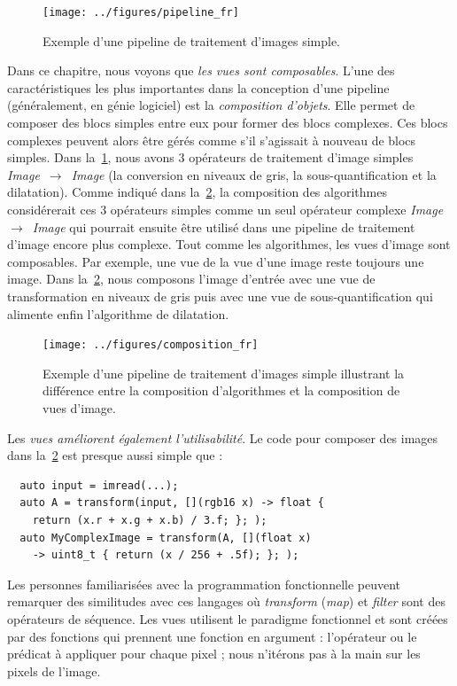 \begin{figure}[htbp]
  \centering
  \texttt{[image: ../figures/pipeline\_fr]}
  \caption[]{Exemple d'une pipeline de traitement d'images simple.}
  \label{resume:fig:view.pipeline}
\end{figure}

Dans ce chapitre, nous voyons que \emph{les vues sont composables}. L'une des caractéristiques les plus importantes dans
la conception d'une pipeline (généralement, en génie logiciel) est la \emph{composition d'objets}. Elle permet de
composer des blocs simples entre eux pour former des blocs complexes. Ces blocs complexes peuvent alors être gérés comme
s'il s'agissait à nouveau de blocs simples. Dans la~\cref{resume:fig:view.pipeline}, nous avons 3 opérateurs de
traitement d'image simples \emph{Image}~\(\rightarrow\)~\emph{Image} (la conversion en niveaux de gris, la
sous-quantification et la dilatation). Comme indiqué dans la~\cref{resume:fig:view.comp}, la composition des algorithmes
considérerait ces 3 opérateurs simples comme un seul opérateur complexe \emph{Image}~\(\rightarrow\)~\emph{Image} qui
pourrait ensuite être utilisé dans une pipeline de traitement d'image encore plus complexe. Tout comme les algorithmes,
les vues d'image sont composables. Par exemple, une vue de la vue d'une image reste toujours une image. Dans
la~\cref{resume:fig:view.comp}, nous composons l'image d'entrée avec une vue de transformation en niveaux de gris puis
avec une vue de sous-quantification qui alimente enfin l'algorithme de dilatation.

\begin{figure}[htbp]
  \centering
  \texttt{[image: ../figures/composition\_fr]}
  \caption[]{Exemple d'une pipeline de traitement d'images simple illustrant la différence entre la composition
    d'algorithmes et la composition de vues d'image.}
  \label{resume:fig:view.comp}
\end{figure}

Les \emph{vues améliorent également l'utilisabilité}. Le code pour composer des images dans
la~\cref{resume:fig:view.comp} est presque aussi simple que :

\begin{verbatim}
  auto input = imread(...);
  auto A = transform(input, [](rgb16 x) -> float {
    return (x.r + x.g + x.b) / 3.f; }; );
  auto MyComplexImage = transform(A, [](float x)
    -> uint8_t { return (x / 256 + .5f); }; );
\end{verbatim}

Les personnes familiarisées avec la programmation fonctionnelle peuvent remarquer des similitudes avec ces langages où
\emph{transform} (\emph{map}) et \emph{filter} sont des opérateurs de séquence. Les vues utilisent le paradigme
fonctionnel et sont créées par des fonctions qui prennent une fonction en argument : l'opérateur ou le prédicat à
appliquer pour chaque pixel ; nous n'itérons pas à la main sur les pixels de l'image.

